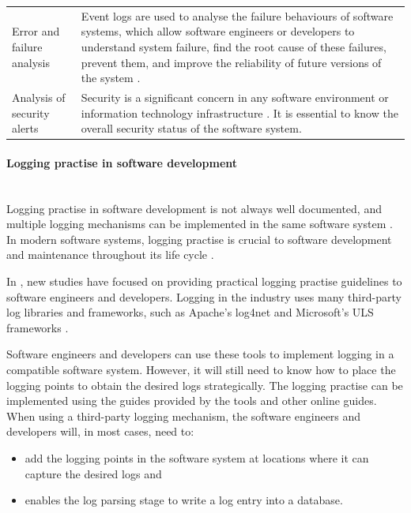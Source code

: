 \begin{xltabular}{\textwidth}{p{4cm}X}
	Error and failure analysis & \RaggedRight Event logs are used to analyse the failure behaviours of software systems, which allow software engineers or developers to understand system failure, find the root cause of these failures, prevent them, and improve the reliability of future versions of the system \cite{Cinque2013}.\\


	\RaggedRight Analysis of security alerts & \RaggedRight Security is a significant concern in any software environment or information technology infrastructure \cite{Pathan2014, Dwyer2013}. It is essential to know the overall security status of the software system. \\
	\bottomrule
\end{xltabular}

\paragraph{Logging practise in software development}\label{sec:ch1_loggingPractice}\leavevmode\\
Logging practise in software development is not always well documented, and multiple logging mechanisms can be implemented in the same software system \cite{Pecchia2015, Kitchenham2007}. In modern software systems, logging practise is crucial to software development and maintenance throughout its life cycle \cite{Rong2018}.\par In , new studies have focused on providing practical logging practise guidelines to software engineers and developers. Logging in the industry uses many third-party log libraries and frameworks, such as Apache's log4net and Microsoft's ULS frameworks \cite{Zhu2015, Rong2018}.\par Software engineers and developers can use these tools to implement logging in a compatible software system. However, it will still need to know how to place the logging points to obtain the desired logs strategically. The logging practise can be implemented using the guides provided by the tools and other online guides. When using a third-party logging mechanism, the software engineers and developers will, in most cases, need to:

\begin{itemize}
	\item add the logging points in the software system at locations where it can capture the desired logs and
	\item enables the log parsing stage to write a log entry into a database.
\end{itemize}

